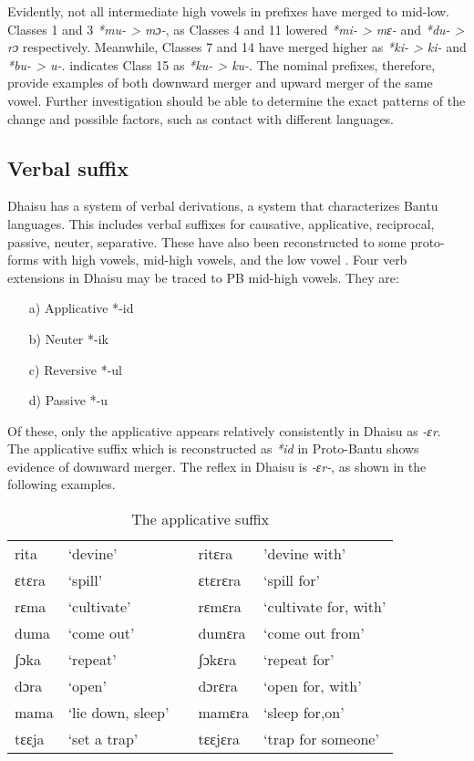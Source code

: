 \documentclass[output=paper,colorlinks,citecolor=brown]{langscibook}
\begin{document}
Evidently, not all intermediate high vowels in prefixes have merged to mid-low. Classes 1 and 3 \textit{*mu- > mɔ-}, as Classes 4 and 11 lowered \textit{*mi- > mɛ-} and \textit{*du- > rɔ} respectively. Meanwhile, Classes 7  and 14 have merged higher as \textit{*ki- > ki-} and \textit{*bu- > u-}. \cite[32]{Nurse2000}  indicates Class 15 as \textit{*ku- > ku-}. The nominal prefixes, therefore, provide examples of both downward merger and upward merger of the same vowel. Further investigation should be able to determine the exact patterns of the change and possible factors, such as contact with different languages.

\subsection{Verbal suffix}\label{sec:ngonyani:4.2}

Dhaisu has a system of verbal derivations, a system that characterizes Bantu languages. This includes verbal suffixes for causative, applicative, reciprocal, passive, neuter, separative. These have also been reconstructed to some proto-forms with high vowels, mid-high vowels, and the low vowel \citep{Meeussen1967}. Four verb extensions in Dhaisu may be traced to PB mid-high vowels. They are:

\begin{enumerate}
    \item[a)] Applicative *-id
    \item[b)] Neuter *-ik
    \item[c)] Reversive *-ul
    \item[d)] Passive *-u
\end{enumerate}

Of these, only the applicative appears relatively consistently in Dhaisu as \textit{-ɛr}. The applicative suffix which is reconstructed as \textit{*id} in Proto-Bantu \cite[92]{Meeussen1967} shows evidence of downward merger. The reflex in Dhaisu is \textit{-ɛr-}, as shown in the following examples.

\begin{table}
    \caption{The applicative suffix}
    \label{tab:ngonyani:15}
    \begin{tabular}{@{}l l l l l@{}}
        rita &  `devine' & & ritɛra & 'devine with' \\
        ɛtɛra & `spill' & & ɛtɛrɛra & `spill for'\\
        rɛma & `cultivate' & & rɛmɛra & `cultivate for, with'\\
        duma & `come out' & & dumɛra & `come out from'\\
        ʃɔka & `repeat' & & ʃɔkɛra & `repeat for'\\
        dɔra & `open' & & dɔrɛra & `open for, with'\\
        mama & `lie down, sleep' & & mamɛra & `sleep for,on'\\
        tɛɛja & `set a trap' & & tɛɛjɛra & `trap for someone'\\
    \end{tabular}
\end{table}
\end{document}
